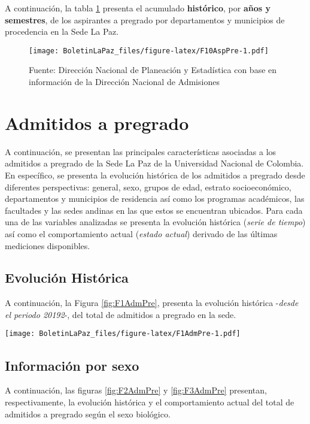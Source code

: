 \documentclass[
]{book}
\begin{document}
A continuación, la tabla \ref{fig:F10AspPre} presenta el acumulado \textbf{histórico}, por \textbf{años y semestres}, de los aspirantes a pregrado por departamentos y municipios de procedencia en la Sede La Paz.

\begin{figure}
\centering
\texttt{[image: BoletinLaPaz\_files/figure-latex/F10AspPre-1.pdf]}
\caption{\label{fig:F10AspPre}Fuente: Dirección Nacional de Planeación y Estadística con base en información de la Dirección Nacional de Admisiones}
\end{figure}

\hypertarget{AdmPre}{%
\section{Admitidos a pregrado}\label{AdmPre}}

A continuación, se presentan las principales características asociadas a los admitidos a pregrado de la Sede La Paz de la Universidad Nacional de Colombia. En específico, se presenta la evolución histórica de los admitidos a pregrado desde diferentes perspectivas: general, sexo, grupos de edad, estrato socioeconómico, departamentos y municipios de residencia así como los programas académicos, las facultades y las sedes andinas en las que estos se encuentran ubicados. Para cada una de las variables analizadas se presenta la evolución histórica (\emph{serie de tiempo}) así como el comportamiento actual (\emph{estado actual}) derivado de las últimas mediciones disponibles.

\hypertarget{evoluciuxf3n-histuxf3rica-1}{%
\subsection{Evolución Histórica}\label{evoluciuxf3n-histuxf3rica-1}}

A continuación, la Figura \ref{fig:F1AdmPre}, presenta la evolución histórica -\emph{desde el periodo 20192}-, del total de admitidos a pregrado en la sede.

\texttt{[image: BoletinLaPaz\_files/figure-latex/F1AdmPre-1.pdf]}

\hypertarget{informaciuxf3n-por-sexo-1}{%
\subsection{Información por sexo}\label{informaciuxf3n-por-sexo-1}}

A continuación, las figuras \ref{fig:F2AdmPre} y \ref{fig:F3AdmPre} presentan, respectivamente, la evolución histórica y el comportamiento actual del total de admitidos a pregrado según el sexo biológico.
\end{document}
